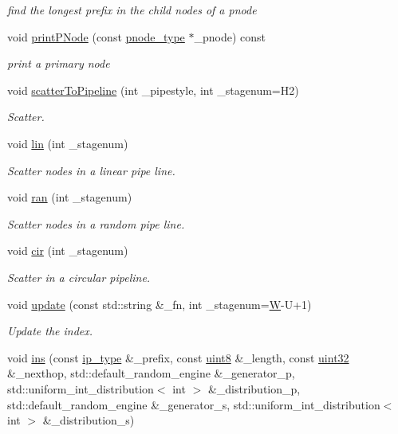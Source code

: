 \begin{DoxyCompactItemize}
\begin{DoxyCompactList}\small\item\em find the longest prefix in the child nodes of a pnode \end{DoxyCompactList}\item 
void \hyperlink{classRMPTree_a6405ff9f920c55e2e7b7255d6ff7c478}{print\-P\-Node} (const \hyperlink{classRMPTree_ac37da419a61106e5996632fc83670959}{pnode\-\_\-type} $\ast$\-\_\-pnode) const 
\begin{DoxyCompactList}\small\item\em print a primary node \end{DoxyCompactList}\item 
void \hyperlink{classRMPTree_a227f397d708cf164e3837434778cd7ff}{scatter\-To\-Pipeline} (int \-\_\-pipestyle, int \-\_\-stagenum=H2)
\begin{DoxyCompactList}\small\item\em Scatter. \end{DoxyCompactList}\item 
void \hyperlink{classRMPTree_a02e278a265a901f31eaabb0a5b94f640}{lin} (int \-\_\-stagenum)
\begin{DoxyCompactList}\small\item\em Scatter nodes in a linear pipe line. \end{DoxyCompactList}\item 
void \hyperlink{classRMPTree_ac6b336010d7aec91920a578b0e830ac9}{ran} (int \-\_\-stagenum)
\begin{DoxyCompactList}\small\item\em Scatter nodes in a random pipe line. \end{DoxyCompactList}\item 
void \hyperlink{classRMPTree_a37d3f0f184f191935ddec8a5af90ba07}{cir} (int \-\_\-stagenum)
\begin{DoxyCompactList}\small\item\em Scatter in a circular pipeline. \end{DoxyCompactList}\item 
void \hyperlink{classRMPTree_aea5eb8ddc2ef237b197ea9712272692e}{update} (const std\-::string \&\-\_\-fn, int \-\_\-stagenum=\hyperlink{test__u128_8cpp_ab21b528bc38899d04d3a7053e52fb797}{W}-\/U+1)
\begin{DoxyCompactList}\small\item\em Update the index. \end{DoxyCompactList}\item 
void \hyperlink{classRMPTree_a21826215602a4748acd707461a40c297}{ins} (const \hyperlink{classRMPTree_a3dc76d54f334071d8a2bac2422db0159}{ip\-\_\-type} \&\-\_\-prefix, const \hyperlink{types_8h_a34ecedcf03a70dc91e4616212d79267d}{uint8} \&\-\_\-length, const \hyperlink{types_8h_abd01e8e67e3d94cab04ecaaf4f85ac1b}{uint32} \&\-\_\-nexthop, std\-::default\-\_\-random\-\_\-engine \&\-\_\-generator\-\_\-p, std\-::uniform\-\_\-int\-\_\-distribution$<$ int $>$ \&\-\_\-distribution\-\_\-p, std\-::default\-\_\-random\-\_\-engine \&\-\_\-generator\-\_\-s, std\-::uniform\-\_\-int\-\_\-distribution$<$ int $>$ \&\-\_\-distribution\-\_\-s)

\end{DoxyCompactItemize}

